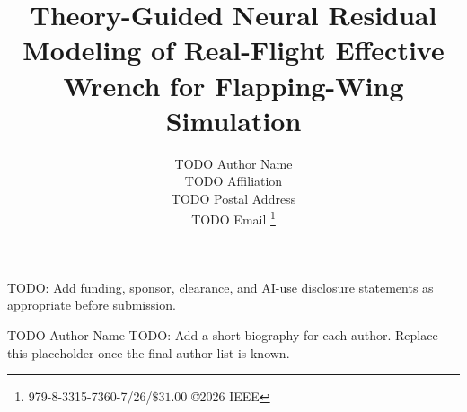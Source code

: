 \documentclass[twocolumn,letterpaper]{IEEEAerospaceCLS}
\title{Theory-Guided Neural Residual Modeling of Real-Flight Effective Wrench for Flapping-Wing Simulation}
\author{%
TODO Author Name\\
TODO Affiliation\\
TODO Postal Address\\
TODO Email
\thanks{\footnotesize 979-8-3315-7360-7/26/$\$31.00$ \copyright2026 IEEE}
}
\begin{document}
\maketitle

\thispagestyle{plain}
\pagestyle{plain}



\tableofcontents








\acknowledgements
TODO: Add funding, sponsor, clearance, and AI-use disclosure statements as appropriate before submission.




\thebiography

\begin{biography}{TODO Author Name}
TODO: Add a short biography for each author. Replace this placeholder once the final author list is known.
\end{biography}
\end{document}
